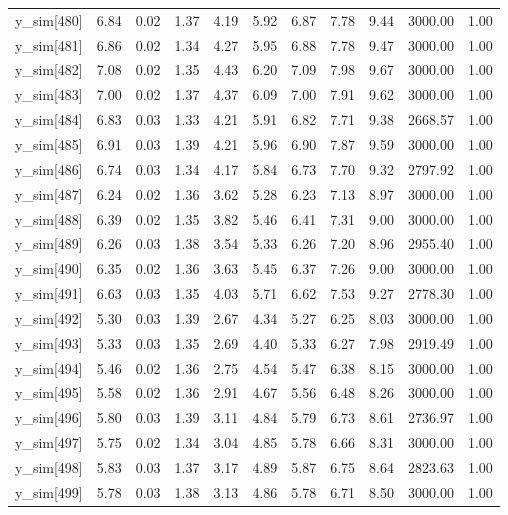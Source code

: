 \begin{table}[ht]
\begin{tabular}{rrrrrrrrrrr}
  y\_sim[480] & 6.84 & 0.02 & 1.37 & 4.19 & 5.92 & 6.87 & 7.78 & 9.44 & 3000.00 & 1.00 \\ 
  y\_sim[481] & 6.86 & 0.02 & 1.34 & 4.27 & 5.95 & 6.88 & 7.78 & 9.47 & 3000.00 & 1.00 \\ 
  y\_sim[482] & 7.08 & 0.02 & 1.35 & 4.43 & 6.20 & 7.09 & 7.98 & 9.67 & 3000.00 & 1.00 \\ 
  y\_sim[483] & 7.00 & 0.02 & 1.37 & 4.37 & 6.09 & 7.00 & 7.91 & 9.62 & 3000.00 & 1.00 \\ 
  y\_sim[484] & 6.83 & 0.03 & 1.33 & 4.21 & 5.91 & 6.82 & 7.71 & 9.38 & 2668.57 & 1.00 \\ 
  y\_sim[485] & 6.91 & 0.03 & 1.39 & 4.21 & 5.96 & 6.90 & 7.87 & 9.59 & 3000.00 & 1.00 \\ 
  y\_sim[486] & 6.74 & 0.03 & 1.34 & 4.17 & 5.84 & 6.73 & 7.70 & 9.32 & 2797.92 & 1.00 \\ 
  y\_sim[487] & 6.24 & 0.02 & 1.36 & 3.62 & 5.28 & 6.23 & 7.13 & 8.97 & 3000.00 & 1.00 \\ 
  y\_sim[488] & 6.39 & 0.02 & 1.35 & 3.82 & 5.46 & 6.41 & 7.31 & 9.00 & 3000.00 & 1.00 \\ 
  y\_sim[489] & 6.26 & 0.03 & 1.38 & 3.54 & 5.33 & 6.26 & 7.20 & 8.96 & 2955.40 & 1.00 \\ 
  y\_sim[490] & 6.35 & 0.02 & 1.36 & 3.63 & 5.45 & 6.37 & 7.26 & 9.00 & 3000.00 & 1.00 \\ 
  y\_sim[491] & 6.63 & 0.03 & 1.35 & 4.03 & 5.71 & 6.62 & 7.53 & 9.27 & 2778.30 & 1.00 \\ 
  y\_sim[492] & 5.30 & 0.03 & 1.39 & 2.67 & 4.34 & 5.27 & 6.25 & 8.03 & 3000.00 & 1.00 \\ 
  y\_sim[493] & 5.33 & 0.03 & 1.35 & 2.69 & 4.40 & 5.33 & 6.27 & 7.98 & 2919.49 & 1.00 \\ 
  y\_sim[494] & 5.46 & 0.02 & 1.36 & 2.75 & 4.54 & 5.47 & 6.38 & 8.15 & 3000.00 & 1.00 \\ 
  y\_sim[495] & 5.58 & 0.02 & 1.36 & 2.91 & 4.67 & 5.56 & 6.48 & 8.26 & 3000.00 & 1.00 \\ 
  y\_sim[496] & 5.80 & 0.03 & 1.39 & 3.11 & 4.84 & 5.79 & 6.73 & 8.61 & 2736.97 & 1.00 \\ 
  y\_sim[497] & 5.75 & 0.02 & 1.34 & 3.04 & 4.85 & 5.78 & 6.66 & 8.31 & 3000.00 & 1.00 \\ 
  y\_sim[498] & 5.83 & 0.03 & 1.37 & 3.17 & 4.89 & 5.87 & 6.75 & 8.64 & 2823.63 & 1.00 \\ 
  y\_sim[499] & 5.78 & 0.03 & 1.38 & 3.13 & 4.86 & 5.78 & 6.71 & 8.50 & 3000.00 & 1.00 \\ 

\end{tabular}
\end{table}
